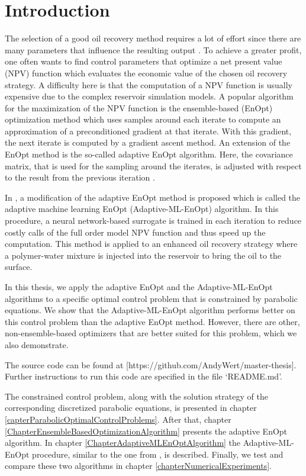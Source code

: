 \chapter{Introduction}

The selection of a good oil recovery method requires a lot of effort since there are many parameters that influence the resulting output \cite{doi:10.1137/1.9780898717075}. To achieve a greater profit, one often wants to find control parameters that optimize a net present value (NPV) function which evaluates the economic value of the chosen oil recovery strategy. A difficulty here is that the computation of a NPV function is usually expensive due to the complex reservoir simulation models. A popular algorithm for the maximization of the NPV function is the ensemble-based (EnOpt) optimization method \cite{articleChen} which uses samples around each iterate to compute an approximation of a preconditioned gradient at that iterate. With this gradient, the next iterate is computed by a gradient ascent method. An extension of the EnOpt method is the so-called adaptive EnOpt algorithm. Here, the covariance matrix, that is used for the sampling around the iterates, is adjusted with respect to the result from the previous iteration \cite{Stordal2016-cj}.

In \cite{Keil2022-dj}, a modification of the adaptive EnOpt method is proposed which is called the adaptive machine learning EnOpt (Adaptive-ML-EnOpt) algorithm. In this procedure, a neural network-based surrogate is trained in each iteration to reduce costly calls of the full order model NPV function and thus speed up the computation. This method is applied to an enhanced oil recovery strategy \cite{ABIDIN201211} where a polymer-water mixture is injected into the reservoir to bring the oil to the surface.

In this thesis, we apply the adaptive EnOpt and the Adaptive-ML-EnOpt algorithms to a specific optimal control problem that is constrained by parabolic equations. We show that the Adaptive-ML-EnOpt algorithm performs better on this control problem than the adaptive EnOpt method. However, there are other, non-ensemble-based optimizers that are better suited for this problem, which we also demonstrate.

The source code can be found at [https://github.com/AndyWert/master-thesis]. Further instructions to run this code are specified in the file `README.md'.

The constrained control problem, along with the solution strategy of the corresponding discretized parabolic equations, is presented in chapter \ref{capterParabolicOptimalControlProblems}. After that, chapter \ref{ChapterEnsembleBasedOptimizationAlgorithm} presents the adaptive EnOpt algorithm. In chapter \ref{ChapterAdaptiveMLEnOptAlgorithm} the Adaptive-ML-EnOpt procedure, similar to the one from \cite{Keil2022-dj}, is described. Finally, we test and compare these two algorithms in chapter \ref{chapterNumericalExperiments}.